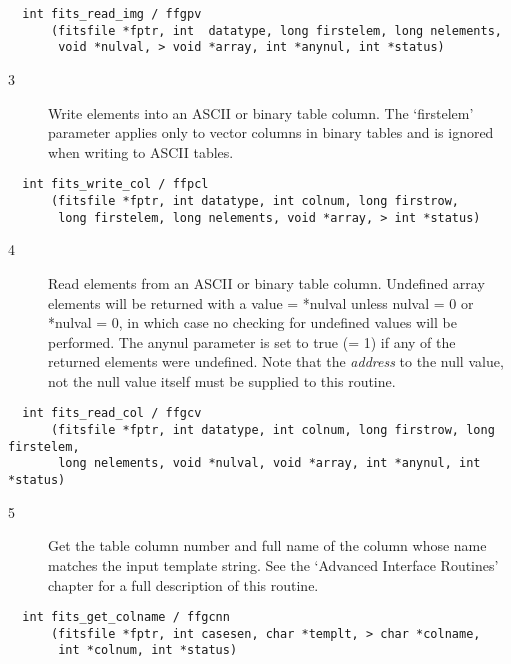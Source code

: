 \begin{verbatim}
  int fits_read_img / ffgpv
      (fitsfile *fptr, int  datatype, long firstelem, long nelements,
       void *nulval, > void *array, int *anynul, int *status)
\end{verbatim}

\begin{description}
\item[3 ] Write elements into an ASCII or binary table column.  The `firstelem'
    parameter applies only to vector columns in binary tables and is
   ignored when writing to ASCII tables.
\end{description}

\begin{verbatim}
  int fits_write_col / ffpcl
      (fitsfile *fptr, int datatype, int colnum, long firstrow,
       long firstelem, long nelements, void *array, > int *status)
\end{verbatim}

\begin{description}
\item[4 ] Read elements from an ASCII or binary table column.  Undefined
    array elements will be returned with a value = *nulval unless nulval = 0
    or *nulval = 0, in which case no checking for undefined values will be
    performed. The anynul parameter is set to true (= 1) if any of the returned
    elements were undefined.  Note that the {\em address} to the
   null value, not the null value itself must be supplied to this routine.
\end{description}

\begin{verbatim}
  int fits_read_col / ffgcv
      (fitsfile *fptr, int datatype, int colnum, long firstrow, long firstelem,
       long nelements, void *nulval, void *array, int *anynul, int *status)
\end{verbatim}

\begin{description}
\item[5 ] Get the table column number and full name of the column whose name
    matches the input template string.  See the `Advanced Interface Routines'
   chapter for a full description of this routine.
\end{description}

\begin{verbatim}
  int fits_get_colname / ffgcnn
      (fitsfile *fptr, int casesen, char *templt, > char *colname,
       int *colnum, int *status)
\end{verbatim}

